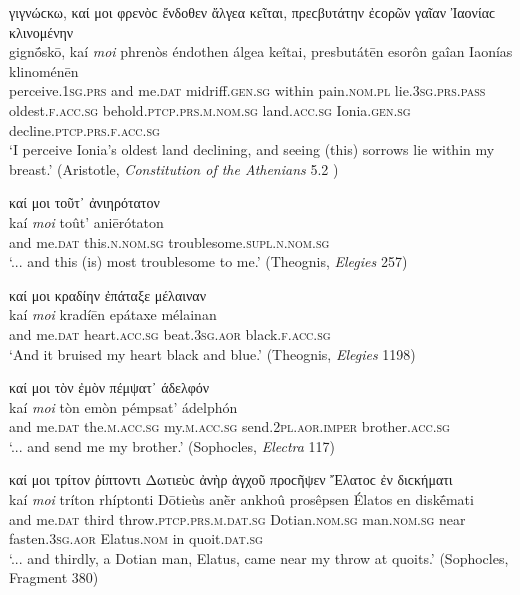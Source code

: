\begin{exe}
\ex γιγνώϲκω, καί μοι φρενὸϲ ἔνδοθεν ἄλγεα κεῖται, πρεϲβυτάτην ἐϲορῶν γαῖαν Ἰαονίαϲ κλινομένην\\
\gll gignṓskō, kaí \emph{moi} phrenòs éndothen álgea keîtai, presbutátēn esorôn gaîan Iaonías klinoménēn\\
perceive.\textsc{1sg.prs} and me.\textsc{dat} midriff.\textsc{gen.sg} within pain.\textsc{nom.pl}
lie.\textsc{3sg.prs.pass} oldest.\textsc{f.acc.sg} behold.\textsc{ptcp.prs.m.nom.sg} land.\textsc{acc.sg} Ionia.\textsc{gen.sg} decline.\textsc{ptcp.prs.f.acc.sg}\\
\trans `I perceive Ionia's oldest land declining, and seeing (this) sorrows lie within my breast.' (Aristotle, \textit{Constitution of the Athenians} 5.2 \citep[14, line 3]{Kenyon1891})\\
\label{kaimoi26}
\end{exe}

\begin{exe}
\ex καί μοι τοῦτ᾽ ἀνιηρότατον\\
\gll kaí \emph{moi} toût' aniērótaton\\
and me.\textsc{dat} this.\textsc{n.nom.sg}
troublesome.\textsc{supl.n.nom.sg}\\
\trans `... and this (is) most troublesome to me.' (Theognis, \textit{Elegies} 257)
\label{kaimoi27}
\end{exe}

\begin{exe}
\ex καί μοι κραδίην ἐπάταξε μέλαιναν\\
\gll kaí \emph{moi} kradíēn epátaxe mélainan\\
and me.\textsc{dat} heart.\textsc{acc.sg} beat.\textsc{3sg.aor}
black.\textsc{f.acc.sg}\\
\trans `And it bruised my heart black and blue.' (Theognis, \textit{Elegies} 1198)
\label{kaimoi28}
\end{exe}

\begin{exe}
\ex καί μοι τὸν ἐμὸν πέμψατ᾽ άδελφόν\\
\gll kaí \emph{moi} tòn emòn pémpsat' ádelphón\\ 
and me.\textsc{dat} the.\textsc{m.acc.sg} my.\textsc{m.acc.sg}
send.\textsc{2pl.aor.imper} brother.\textsc{acc.sg}\\
\trans `... and send me my brother.' (Sophocles, \textit{Electra} 117)
\label{kaimoi29}
\end{exe}

\begin{exe}
\ex καί μοι τρίτον ῥίπτοντι Δωτιεὺϲ ἀνὴρ ἀγχοῦ προϲῆψεν Ἔλατοϲ ἐν διϲκήματι\\
\gll kaí \emph{moi} tríton rhíptonti Dōtieùs anḕr ankhoû prosêpsen Élatos en diskḗmati\\
and me.\textsc{dat} third throw.\textsc{ptcp.prs.m.dat.sg} Dotian.\textsc{nom.sg} man.\textsc{nom.sg} near fasten.\textsc{3sg.aor} Elatus.\textsc{nom} in quoit.\textsc{dat.sg}\\
\trans `... and thirdly, a Dotian man, Elatus, came near my throw at quoits.' (Sophocles, Fragment 380)
\label{kaimoi30}
\end{exe}

